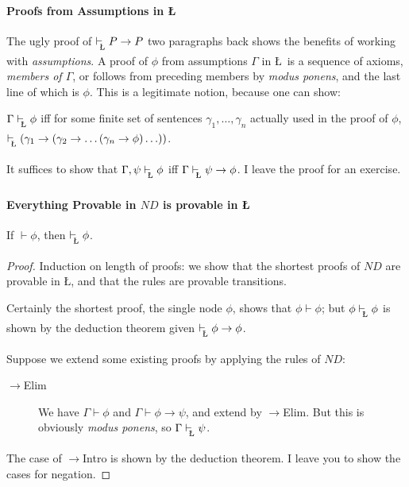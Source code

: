 {\paragraph{Proofs from Assumptions in \L}

The ugly proof of $\lvdash P\to P$ two paragraphs back shows the benefits of working with \emph{assumptions}. A proof of $\phi$ from assumptions $\Gamma$ in \L\ is a sequence of axioms, \emph{members of $\Gamma$}, or follows from preceding members by \emph{modus ponens}, and the last line of which is $\phi$.
This is a legitimate notion, because one can show: \begin{theorem}
	 $\Gamma\lvdash\phi$ iff for some finite set of sentences $\gamma_{1},\ldots,\gamma_{n}$ actually used in the proof of $\phi$, $\lvdash (\gamma_{1}\to(\gamma_{2} \to \ldots (\gamma_{n} \to \phi)\ldots))$.
\end{theorem} It suffices to show that $\Gamma,\psi\lvdash\phi$ iff $\Gamma\lvdash\psi\to\phi$. I leave the proof for an exercise.
}


{
\paragraph{Everything Provable in $ND$ is provable in \L}
\begin{theorem}
	If $\vdash \phi$, then $\lvdash \phi$. \begin{proof}
		{ Induction on length of proofs: we show that the shortest proofs of $ND$ are provable in \L, and	that the rules are provable transitions.
		
	Certainly the shortest proof, the single node $\phi$, shows that $\phi\vdash\phi$; but $\phi\lvdash\phi$ is shown by the deduction theorem given $\lvdash \phi\to\phi$.
	
	Suppose we extend some existing  proofs by applying the rules of $ND$: \begin{description}
		\item[$\to$Elim] We have $\Gamma\vdash\phi$ and $\Gamma\vdash\phi\to\psi$, and extend by $\to$Elim. But this is obviously \emph{modus ponens}, so $\Gamma\lvdash\psi$.
	\end{description}
The case of $\to$Intro is shown by the deduction theorem. I leave you to show the cases for negation.}	\end{proof}
\end{theorem}
}

